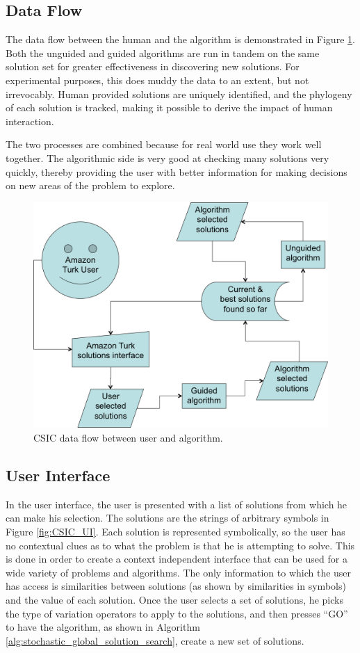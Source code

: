 \subsection{Data Flow}
The data flow between the human and the algorithm is demonstrated in Figure \ref{fig:data_flow}.  Both the unguided and guided algorithms are run in tandem on the same solution set for greater effectiveness in discovering new solutions.  For experimental purposes, this does muddy the data to an extent, but not irrevocably.  Human provided solutions are uniquely identified, and the phylogeny of each solution is tracked, making it possible to derive the impact of human interaction.  

The two processes are combined because for real world use they work well together.  The algorithmic side is very good at checking many solutions very quickly, thereby providing the user with better information for making decisions on new areas of the problem to explore.

\begin{figure}[!t]
  \centering
  \includegraphics[width=4.5in]{HollowayDataFlow}
  \caption{CSIC data flow between user and algorithm.}
  \label{fig:data_flow}
\end{figure}

\subsection{User Interface}

In the user interface, the user is presented with a list of solutions from which he can make his selection.  The solutions are the strings of arbitrary symbols in Figure \ref{fig:CSIC_UI}.  Each solution is represented symbolically, so the user has no contextual clues as to what the problem is that he is attempting to solve.  This is done in order to create a context independent interface that can be used for a wide variety of problems and algorithms. The only information to which the user has access is similarities between solutions (as shown by similarities in symbols) and the value of each solution. Once the user selects a set of solutions, he picks the type of variation operators to apply to the solutions, and then presses ``GO'' to have the algorithm, as shown in Algorithm \ref{alg:stochastic_global_solution_search}, create a new set of solutions.

